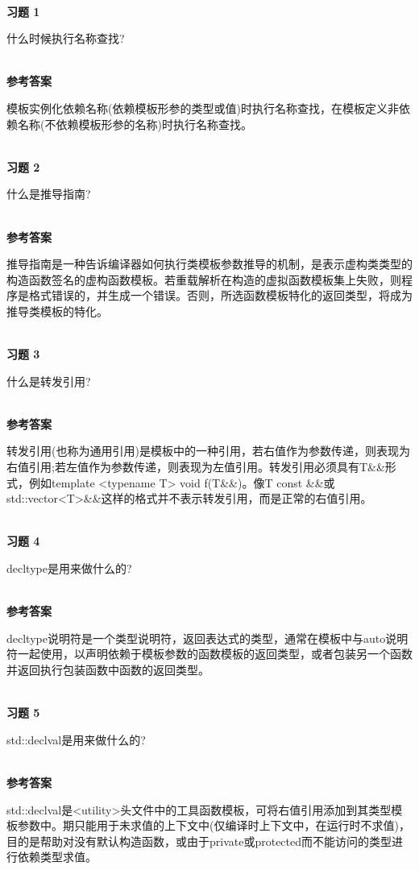 \hspace*{\fill} \\ %
\noindent
\textbf{习题 1}

什么时候执行名称查找?

\hspace*{\fill} \\ %
\noindent
\textbf{参考答案}

模板实例化依赖名称(依赖模板形参的类型或值)时执行名称查找，在模板定义非依赖名称(不依赖模板形参的名称)时执行名称查找。


\hspace*{\fill} \\ %
\noindent
\textbf{习题 2}

什么是推导指南?

\hspace*{\fill} \\ %
\noindent
\textbf{参考答案}

推导指南是一种告诉编译器如何执行类模板参数推导的机制，是表示虚构类类型的构造函数签名的虚构函数模板。若重载解析在构造的虚拟函数模板集上失败，则程序是格式错误的，并生成一个错误。否则，所选函数模板特化的返回类型，将成为推导类模板的特化。

\hspace*{\fill} \\ %
\noindent
\textbf{习题 3}

什么是转发引用?

\hspace*{\fill} \\ %
\noindent
\textbf{参考答案}

转发引用(也称为通用引用)是模板中的一种引用，若右值作为参数传递，则表现为右值引用;若左值作为参数传递，则表现为左值引用。转发引用必须具有T\&\&形式，例如template <typename T> void f(T\&\&)。像T const \&\&或std::vector<T>\&\&这样的格式并不表示转发引用，而是正常的右值引用。

\hspace*{\fill} \\ %
\noindent
\textbf{习题 4}

decltype是用来做什么的?

\hspace*{\fill} \\ %
\noindent
\textbf{参考答案}

decltype说明符是一个类型说明符，返回表达式的类型，通常在模板中与auto说明符一起使用，以声明依赖于模板参数的函数模板的返回类型，或者包装另一个函数并返回执行包装函数中函数的返回类型。

\hspace*{\fill} \\ %
\noindent
\textbf{习题 5}

std::declval是用来做什么的?

\hspace*{\fill} \\ %
\noindent
\textbf{参考答案}

std::declval是<utility>头文件中的工具函数模板，可将右值引用添加到其类型模板参数中。期只能用于未求值的上下文中(仅编译时上下文中，在运行时不求值)，目的是帮助对没有默认构造函数，或由于private或protected而不能访问的类型进行依赖类型求值。












